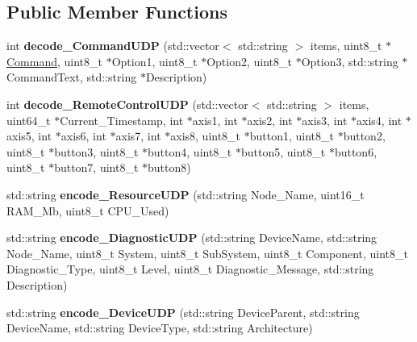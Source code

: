 \subsection*{Public Member Functions}
\begin{DoxyCompactItemize}
\item 
\mbox{\label{classUDPMessageHandler_a5cebe6f420dd76d476a7df8bf92fe3c4}} 
int {\bfseries decode\+\_\+\+Command\+U\+DP} (std\+::vector$<$ std\+::string $>$ items, uint8\+\_\+t $\ast$\hyperlink{structCommand}{Command}, uint8\+\_\+t $\ast$Option1, uint8\+\_\+t $\ast$Option2, uint8\+\_\+t $\ast$Option3, std\+::string $\ast$Command\+Text, std\+::string $\ast$Description)
\item 
\mbox{\label{classUDPMessageHandler_a371c548b26e47d1737e09edebd95491a}} 
int {\bfseries decode\+\_\+\+Remote\+Control\+U\+DP} (std\+::vector$<$ std\+::string $>$ items, uint64\+\_\+t $\ast$Current\+\_\+\+Timestamp, int $\ast$axis1, int $\ast$axis2, int $\ast$axis3, int $\ast$axis4, int $\ast$axis5, int $\ast$axis6, int $\ast$axis7, int $\ast$axis8, uint8\+\_\+t $\ast$button1, uint8\+\_\+t $\ast$button2, uint8\+\_\+t $\ast$button3, uint8\+\_\+t $\ast$button4, uint8\+\_\+t $\ast$button5, uint8\+\_\+t $\ast$button6, uint8\+\_\+t $\ast$button7, uint8\+\_\+t $\ast$button8)
\item 
\mbox{\label{classUDPMessageHandler_a36dcebda26d88ed5dd0a3ae0f5a8e4f6}} 
std\+::string {\bfseries encode\+\_\+\+Resource\+U\+DP} (std\+::string Node\+\_\+\+Name, uint16\+\_\+t R\+A\+M\+\_\+\+Mb, uint8\+\_\+t C\+P\+U\+\_\+\+Used)
\item 
\mbox{\label{classUDPMessageHandler_a8489d4be9fee03ee7ad02797a5718d4b}} 
std\+::string {\bfseries encode\+\_\+\+Diagnostic\+U\+DP} (std\+::string Device\+Name, std\+::string Node\+\_\+\+Name, uint8\+\_\+t System, uint8\+\_\+t Sub\+System, uint8\+\_\+t Component, uint8\+\_\+t Diagnostic\+\_\+\+Type, uint8\+\_\+t Level, uint8\+\_\+t Diagnostic\+\_\+\+Message, std\+::string Description)
\item 
\mbox{\label{classUDPMessageHandler_a4f8fdcb90626ec71db44beda0c0e2000}} 
std\+::string {\bfseries encode\+\_\+\+Device\+U\+DP} (std\+::string Device\+Parent, std\+::string Device\+Name, std\+::string Device\+Type, std\+::string Architecture)

\end{DoxyCompactItemize}
